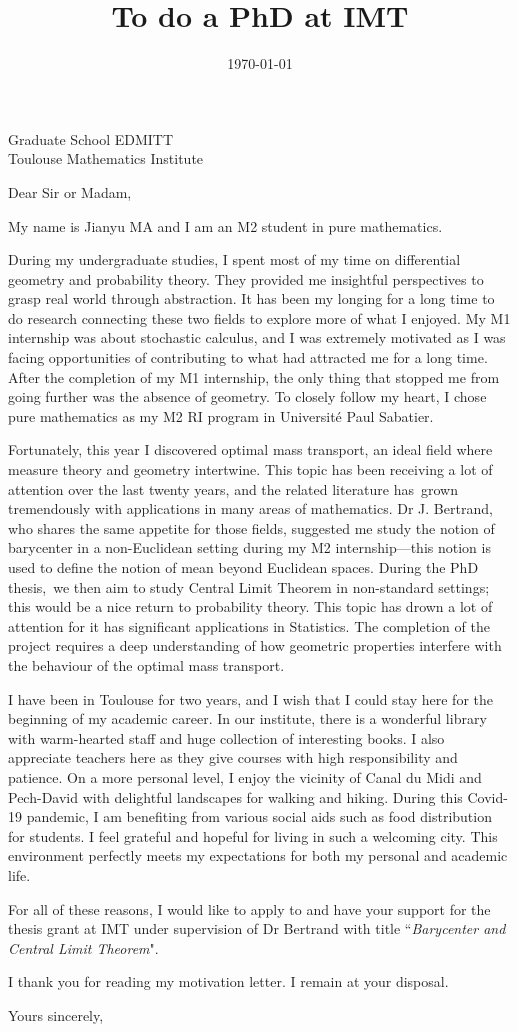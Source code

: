 \documentclass[11pt,a4paper]{letter}
\title{To do a PhD at IMT}
\date{\today}
\begin{document}
\begin{letter}{Graduate School EDMITT \\Toulouse Mathematics Institute}
	\opening{Dear Sir or Madam,}

	\setlength\parindent{1em}
	My name is Jianyu MA and I am an M2 student in pure mathematics.

	During my undergraduate studies, I spent most of my time on differential geometry and probability theory.
	They provided me insightful perspectives to grasp real world through abstraction.
	It has been my longing for a long time to do research connecting these two fields to explore more of what I enjoyed. My M1 internship was about stochastic calculus, and I was extremely motivated as I was facing opportunities of contributing to what had attracted me for a long time.
	After the completion of my M1 internship, the only thing that stopped me from going further was the absence of geometry.
	To closely follow my heart, I chose pure mathematics as my M2 RI program in Université Paul Sabatier.

	Fortunately, this year I discovered optimal mass transport, an ideal field where measure theory and geometry intertwine.
	This topic has been receiving a lot of attention over the last twenty years, and the related literature has grown tremendously with applications in many areas of mathematics.
	Dr J. Bertrand, who shares the same appetite for those fields, suggested me study the notion of barycenter in a non-Euclidean setting during my M2 internship---this notion is used to define the notion of mean beyond Euclidean spaces.
	During the PhD thesis, we then aim to study Central Limit Theorem in non-standard settings; this would be a nice return to probability theory. This topic has drown a lot of attention for it has significant applications in Statistics. The completion of the project requires a deep understanding of how geometric properties interfere with the behaviour of the optimal mass transport.

	I have been in Toulouse for two years, and I wish that I could stay here for the beginning of my academic career.
	In our institute, there is a wonderful library with warm-hearted staff and huge collection of interesting books.
	I also appreciate teachers here as they give courses with high responsibility and patience.
	On a more personal level, I enjoy the vicinity of Canal du Midi and Pech-David with delightful landscapes for walking and hiking.
	During this Covid-19 pandemic, I am benefiting from various social aids such as food distribution for students.
	I feel grateful and hopeful for living in such a welcoming city.
	This environment perfectly meets my expectations for both my personal and academic life.

	For all of these reasons,  I would like to apply to and have your support for the thesis grant at IMT under supervision of Dr Bertrand with title ``\emph{Barycenter and Central Limit Theorem}".

	I thank you for reading my motivation letter.  I remain at your disposal.
	\closing{Yours sincerely,}
\end{letter}
\end{document}
